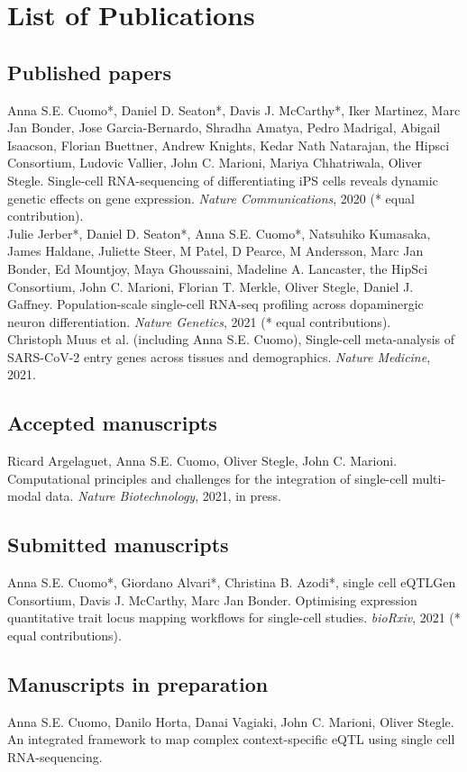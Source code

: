 \chapter{List of Publications}

\section{Published papers}

Anna S.E. Cuomo*, Daniel D. Seaton*, Davis J. McCarthy*, Iker Martinez, Marc Jan Bonder, Jose Garcia-Bernardo, Shradha Amatya, Pedro Madrigal, Abigail Isaacson, Florian Buettner, Andrew Knights, Kedar Nath Natarajan, the Hipsci Consortium, Ludovic Vallier, John C. Marioni, Mariya Chhatriwala, Oliver Stegle. 
Single-cell RNA-sequencing of differentiating iPS cells reveals dynamic genetic effects on gene expression. \textit{Nature Communications}, 2020 (* equal contribution). \\

Julie Jerber*, Daniel D. Seaton*, Anna S.E. Cuomo*, Natsuhiko Kumasaka, James Haldane, Juliette Steer, M Patel, D Pearce, M Andersson, Marc Jan Bonder, Ed Mountjoy, Maya Ghoussaini, Madeline A. Lancaster, the HipSci Consortium, John C. Marioni, Florian T. Merkle, Oliver Stegle, Daniel J. Gaffney.
Population-scale single-cell RNA-seq profiling across dopaminergic neuron differentiation. \textit{Nature Genetics}, 2021 (* equal contributions). \\

Christoph Muus et al. (including Anna S.E. Cuomo), Single-cell meta-analysis of SARS-CoV-2 entry genes across tissues and demographics. \textit{Nature Medicine}, 2021.

\section{Accepted manuscripts}

Ricard Argelaguet, Anna S.E. Cuomo, Oliver Stegle, John C. Marioni. 
Computational principles and challenges for the integration of single-cell multi-modal data. \textit{Nature Biotechnology}, 2021, in press. 

\section{Submitted manuscripts}

Anna S.E. Cuomo*, Giordano Alvari*, Christina B. Azodi*, single cell eQTLGen Consortium, Davis J. McCarthy, Marc Jan Bonder.  
Optimising expression quantitative trait locus mapping workflows for single-cell studies. \textit{bioRxiv}, 2021 (* equal contributions). 

\section{Manuscripts in preparation}

Anna S.E. Cuomo, Danilo Horta, Danai Vagiaki, John C. Marioni, Oliver Stegle.
An integrated framework to map complex context-specific eQTL using single cell RNA-sequencing.